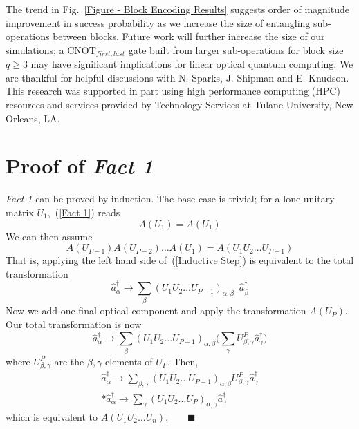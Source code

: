 \documentclass[aps,pra,twocolumn,showpacs,superscriptaddress,floatfix,10pt]{revtex4}
\begin{document}
 The trend in Fig.~\ref{Figure - Block Encoding Results} suggests order of magnitude improvement in success probability as we increase the size of entangling sub-operations between blocks. Future work will further increase the size of our simulations; a $\mbox{CNOT}_{first,last}$ gate built from larger sub-operations for block size $q \ge 3$ may have significant implications for linear optical quantum computing.
\acknowledgments
We are thankful for helpful discussions with N. Sparks, J. Shipman and E. Knudson. This research was supported in part using high performance computing (HPC) resources and services provided by Technology Services at Tulane University, New Orleans, LA.
\appendix
\section{Proof of \textit{Fact 1}}
\label{Proof of Fact 1}
\textit{Fact 1} can be proved by induction. The base case is trivial; for a lone unitary matrix $U_1$,~(\ref{Fact 1}) reads
\begin{equation}
	A(U_1) = A(U_1)
\end{equation}
We can then assume
\begin{equation}
\label{Inductive Step}
	A(U_{P-1}) A(U_{P-2}) \dots A(U_1) = A(U_1 U_2 \dots U_{P-1})
\end{equation}
That is, applying the left hand side of~(\ref{Inductive Step}) is equivalent to the total transformation
\begin{equation}
	\hat{a}^\dagger_\alpha \rightarrow \sum_\beta (U_1 U_2 \dots U_{P-1})_{\alpha,\beta} \enspace \hat{a}^\dagger_\beta
\end{equation}
Now we add one final optical component and apply the transformation $A(U_P)$. Our total transformation is now
\begin{equation}
	\hat{a}^\dagger_\alpha \rightarrow \sum_\beta (U_1 U_2 \dots U_{P-1})_{\alpha,\beta} \Big(\sum_\gamma U_{\beta,\gamma}^P \hat{a}^\dagger_\gamma \Big)
\end{equation}
where $U_{\beta,\gamma}^P$ are the $\beta,\gamma$ elements of $U_P$. Then,
\begin{eqnarray}
\hat{a}^\dagger_\alpha \rightarrow \sum_{\beta,\gamma} (U_1 U_2 \dots U_{P-1})_{\alpha,\beta} U^P_{\beta,\gamma} \hat{a}^\dagger_\gamma
\\*
\hat{a}^\dagger_\alpha \rightarrow \sum_\gamma (U_1 U_2 \dots U_P)_{\alpha,\gamma} \hat{a}^\dagger_\gamma \quad
\end{eqnarray}
which is equivalent to $A(U_1 U_2 \dots U_n). \quad \quad\blacksquare $
\end{document}

